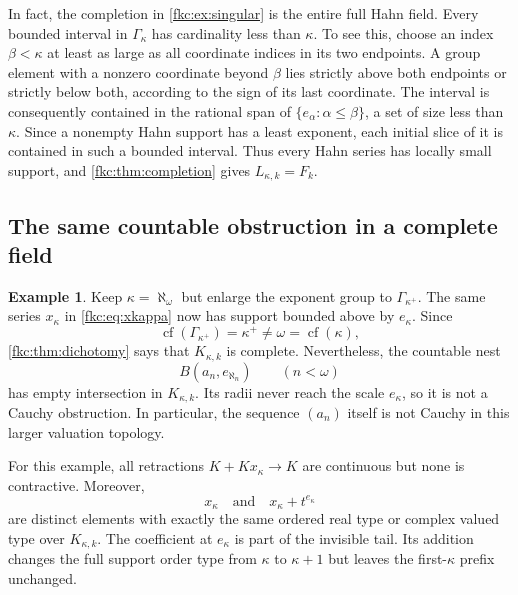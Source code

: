 \documentclass[11pt,letterpaper]{article}
\numberwithin{equation}{section}
\theoremstyle{definition}
\newtheorem{example}[theorem]{Example}
\theoremstyle{remark}
\newcommand{\cf}{\operatorname{cf}}
\begin{document}
In fact, the completion in \cref{fkc:ex:singular} is the entire full Hahn field. Every bounded interval in $\Gamma_\kappa$ has cardinality less than $\kappa$. To see this, choose an index $\beta<\kappa$ at least as large as all coordinate indices in its two endpoints. A group element with a nonzero coordinate beyond $\beta$ lies strictly above both endpoints or strictly below both, according to the sign of its last coordinate. The interval is consequently contained in the rational span of $\{e_\alpha:\alpha\le\beta\}$, a set of size less than $\kappa$. Since a nonempty Hahn support has a least exponent, each initial slice of it is contained in such a bounded interval. Thus every Hahn series has locally small support, and \cref{fkc:thm:completion} gives $L_{\kappa,k}=F_k$.

\subsection{The same countable obstruction in a complete field}
\begin{example}\label{fkc:ex:complete}
Keep $\kappa=\aleph_\omega$ but enlarge the exponent group to $\Gamma_{\kappa^+}$. The same series $x_\kappa$ in \eqref{fkc:eq:xkappa} now has support bounded above by $e_\kappa$. Since
\[
 \cf(\Gamma_{\kappa^+})=\kappa^+\ne\omega=\cf(\kappa),
\]
\cref{fkc:thm:dichotomy} says that $K_{\kappa,k}$ is complete. Nevertheless, the countable nest
\[
 B(a_n,e_{\aleph_n})\qquad(n<\omega)
\]
has empty intersection in $K_{\kappa,k}$. Its radii never reach the scale $e_\kappa$, so it is not a Cauchy obstruction. In particular, the sequence $(a_n)$ itself is not Cauchy in this larger valuation topology.
\end{example}

For this example, all retractions $K+Kx_\kappa\to K$ are continuous but none is contractive. Moreover,
\[
 x_\kappa\quad\text{and}\quad x_\kappa+t^{e_\kappa}
\]
are distinct elements with exactly the same ordered real type or complex valued type over $K_{\kappa,k}$. The coefficient at $e_\kappa$ is part of the invisible tail. Its addition changes the full support order type from $\kappa$ to $\kappa+1$ but leaves the first-$\kappa$ prefix unchanged.
\end{document}
